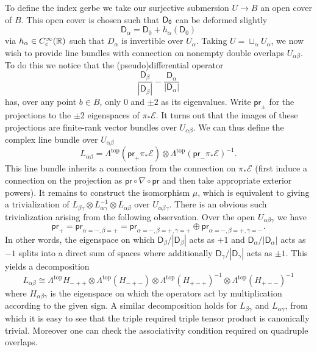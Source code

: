 \documentclass{amsart}
\renewcommand\d{\mathsf{D}}
\begin{document}
\begin{example}
    To define the index gerbe we take our surjective submersion $U\to B$ an open cover of $B$.
    This open cover is chosen such that $\sf D_0$ can be deformed slightly
    \begin{equation*}
        \d_\alpha = \d_0 + h_\alpha(\d_0)
    \end{equation*}
    via $h_\alpha\in C^\infty_c(\mathbb{R})$ such that $D_\alpha$ is invertible over $U_\alpha$.
    Taking $U=\sqcup_\alpha U_\alpha$, we now wish to provide line bundles with connection
    on nonempty double overlaps $U_{\alpha\beta}$. To do this we notice that the
    (pseudo)differential operator
    \begin{equation*}
        \frac{\d_\beta}{|\d_\beta|} - \frac{\d_\alpha}{|\d_\alpha|}
    \end{equation*}
    has, over any point $b\in B$, only 0 and $\pm 2$ as its eigenvalues. Write $\mathsf{pr}_{\pm}$
    for the projections to the $\pm 2$ eigenspaces of $\pi_*\mathcal{E}$. It turns
    out that the images of these projections are finite-rank vector bundles over $U_{\alpha\beta}$.
    We can thus define the complex line bundle over $U_{\alpha\beta}$
    \begin{equation*}
        L_{\alpha\beta} = \Lambda^\text{top}(\mathsf{pr}_+\pi_*\mathcal{E}) \otimes \Lambda^\text{top}(\mathsf{pr}_-\pi_*\mathcal{E})^{-1}.
    \end{equation*}
    This line bundle inherits a connection from the connection on $\pi_*\mathcal{E}$ (first
    induce a connection on the projection as $\mathsf{pr}\circ \nabla\circ \mathsf{pr}$ and
    then take appropriate exterior powers). It remains to construct the isomorphism $\mu$,
    which is equivalent to giving a trivialization of
    $L_{\beta\gamma}\otimes L_{\alpha\gamma}^{-1}\otimes L_{\alpha\beta}$ over $U_{\alpha\beta\gamma}$.
    There is an obvious such trivialization arising from the following observation.
    Over the open $U_{\alpha\beta\gamma}$ we have
    \begin{equation*}
        \mathsf{pr}_{+} = \mathsf{pr}_{\alpha=-,\beta=+} = \mathsf{pr}_{\alpha=-,\beta=+,\gamma=+}
        \oplus \mathsf{pr}_{\alpha=-,\beta=+,\gamma=-}.
    \end{equation*}
    In other words, the eigenspace on which $\d_\beta/|\d_\beta|$ acts as $+1$ and
    $\d_\alpha/|\d_\alpha|$ acts as $-1$ splits into a direct sum of spaces where 
    additionally $\d_\gamma/|\d_\gamma|$ acts as $\pm 1$. This yields a decomposition
    \begin{equation*}
        L_{\alpha\beta} \cong \Lambda^\text{top}H_{-++}\otimes\Lambda^\text{top}(H_{-+-})
        \otimes\Lambda^\text{top}(H_{+-+})^{-1} \otimes \Lambda^\text{top}(H_{+--})^{-1}
    \end{equation*}
    where $H_{\alpha\beta\gamma}$ is the eigenspace on which the operators act 
    by multiplication according to the given sign. A similar decomposition holds for
    $L_{\beta\gamma}$ and $L_{\alpha\gamma}$, from which it is easy to see that the triple
    required triple tensor product is canonically trivial. Moreover one can check the
    associativity condition required on quadruple overlaps.
    

\end{example}
\end{document}
